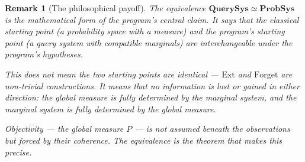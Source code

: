 \documentclass[11pt]{article}
\newtheorem{remark}{Remark}
\newcommand{\QSys}{\mathbf{QuerySys}}
\newcommand{\PSys}{\mathbf{ProbSys}}
\newcommand{\Ext}{\mathrm{Ext}}
\newcommand{\Forget}{\mathrm{Forget}}
\begin{document}
\begin{remark}[The philosophical payoff]
The equivalence $\QSys \simeq \PSys$ is the mathematical form of the
program's central claim.  It says that the classical starting point
(a probability space with a measure) and the program's starting point
(a query system with compatible marginals) are interchangeable under the
program's hypotheses.

This does not mean the two starting points are identical --- $\Ext$ and
$\Forget$ are non-trivial constructions.  It means that \emph{no information
is lost or gained in either direction}: the global measure is fully
determined by the marginal system, and the marginal system is fully
determined by the global measure.

Objectivity --- the global measure $P$ --- is not assumed beneath the
observations but \emph{forced by their coherence}.  The equivalence is the
theorem that makes this precise.
\end{remark}
\end{document}
